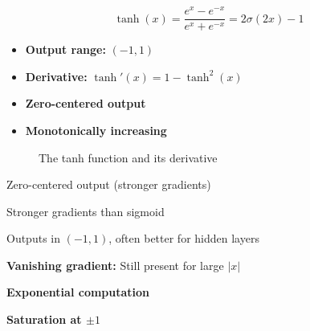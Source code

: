 \begin{equation}
\tanh(x) = \frac{e^x - e^{-x}}{e^x + e^{-x}} = 2\sigma(2x) - 1
\end{equation}

\begin{properties}
\begin{itemize}
    \item \textbf{Output range:} $(-1, 1)$
    \item \textbf{Derivative:} $\tanh'(x) = 1 - \tanh^2(x)$
    \item \textbf{Zero-centered output}
    \item \textbf{Monotonically increasing}
\end{itemize}
\end{properties}

\begin{figure}[htbp]
    \centering
    \caption[Tanh function and its derivative]{The tanh function and its derivative}
    \label{fig:tanh}
\end{figure}

\begin{advantages}
    \item Zero-centered output (stronger gradients)
    \item Stronger gradients than sigmoid
    \item Outputs in $(-1, 1)$, often better for hidden layers
\end{advantages}

\begin{disadvantages}
    \item \textbf{Vanishing gradient:} Still present for large $|x|$
    \item \textbf{Exponential computation}
    \item \textbf{Saturation at $\pm 1$}
\end{disadvantages}

